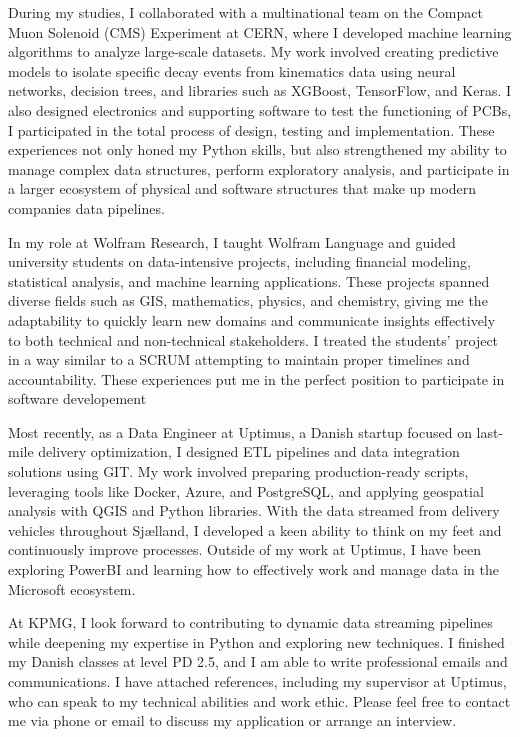 \documentclass[11pt,a4]{article}
\begin{document}
During my studies, I collaborated with a multinational team on the Compact Muon Solenoid (CMS) Experiment at CERN, where I developed machine learning algorithms to analyze large-scale datasets. My work involved creating predictive models to isolate specific decay events from kinematics data using neural networks, decision trees, and libraries such as XGBoost, TensorFlow, and Keras. I also designed electronics and supporting software to test the functioning of PCBs, I participated in the total process of design, testing and implementation. These experiences not only honed my Python skills, but also strengthened my ability to manage complex data structures, perform exploratory analysis, and participate in a larger ecosystem of physical and software structures that make up modern companies data pipelines.

In my role at Wolfram Research, I taught Wolfram Language and guided university students on data-intensive projects, including financial modeling, statistical analysis, and machine learning applications. These projects spanned diverse fields such as GIS, mathematics, physics, and chemistry, giving me the adaptability to quickly learn new domains and communicate insights effectively to both technical and non-technical stakeholders. I treated the students' project in a way similar to a SCRUM attempting to maintain proper timelines and accountability. These experiences put me in the perfect position to participate in software developement

Most recently, as a Data Engineer at Uptimus, a Danish startup focused on last-mile delivery optimization, I designed ETL pipelines and data integration solutions using GIT. My work involved preparing production-ready scripts, leveraging tools like Docker, Azure, and PostgreSQL, and applying geospatial analysis with QGIS and Python libraries. With the data streamed from delivery vehicles throughout Sjælland, I developed a keen ability to think on my feet and continuously improve processes. Outside of my work at Uptimus, I have been exploring PowerBI and learning how to effectively work and manage data in the Microsoft ecosystem.

At KPMG, I look forward to contributing to dynamic data streaming pipelines while deepening my expertise in Python and exploring new techniques. I finished my Danish classes at level PD 2.5, and I am able to write professional emails and communications. I have attached references, including my supervisor at Uptimus, who can speak to my technical abilities and work ethic. Please feel free to contact me via phone or email to discuss my application or arrange an interview.
\end{document}
